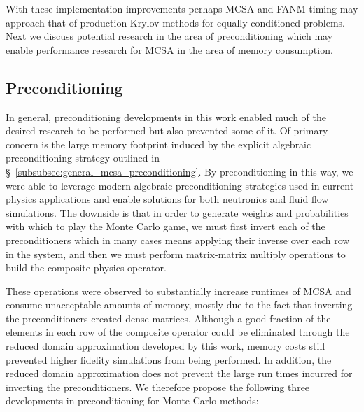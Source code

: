 With these implementation improvements perhaps MCSA and FANM timing
may approach that of production Krylov methods for equally conditioned
problems. Next we discuss potential research in the area of
preconditioning which may enable performance research for MCSA in the
area of memory consumption.

\subsection{Preconditioning}
\label{subsec:future_preconditioning}

In general, preconditioning developments in this work enabled much of
the desired research to be performed but also prevented some of it. Of
primary concern is the large memory footprint induced by the explicit
algebraic preconditioning strategy outlined in
\S~\ref{subsubsec:general_mcsa_preconditioning}. By preconditioning in
this way, we were able to leverage modern algebraic preconditioning
strategies used in current physics applications and enable solutions
for both neutronics and fluid flow simulations. The downside is that
in order to generate weights and probabilities with which to play the
Monte Carlo game, we must first invert each of the preconditioners
which in many cases means applying their inverse over each row in the
system, and then we must perform matrix-matrix multiply operations to
build the composite physics operator.

These operations were observed to substantially increase runtimes of
MCSA and consume unacceptable amounts of memory, mostly due to the
fact that inverting the preconditioners created dense
matrices. Although a good fraction of the elements in each row of the
composite operator could be eliminated through the reduced domain
approximation developed by this work, memory costs still prevented
higher fidelity simulations from being performed. In addition, the
reduced domain approximation does not prevent the large run times
incurred for inverting the preconditioners. We therefore propose the
following three developments in preconditioning for Monte Carlo
methods:

